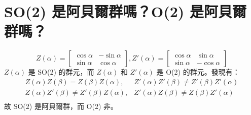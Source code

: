 \documentclass{article}
\begin{document}
\section{\~ SO(2) 是阿貝爾群嗎？O(2) 是阿貝爾群嗎？}
\begin{framed}
  $$Z\left( \alpha  \right) = \left[ {\begin{array}{*{20}{c}}
            {\cos \alpha } & { - \sin \alpha } \\
            {\sin \alpha } & {\cos \alpha }
          \end{array}} \right],Z'\left( \alpha  \right) = \left[ {\begin{array}{*{20}{c}}
            {\cos \alpha } & {\sin \alpha }    \\
            {\sin \alpha } & { - \cos \alpha }
          \end{array}} \right]$$
  $Z\left( \alpha  \right)$ 是 SO(2) 的群元，而 $Z\left( \alpha  \right)$ 和 $Z'\left( \alpha  \right)$ 是 O(2) 的群元。發現有：
  $$\begin{aligned}
      Z\left( \alpha  \right)Z\left( \beta  \right) = Z\left( \beta  \right)Z\left( \alpha  \right),     & Z'\left( \alpha  \right)Z'\left( \beta  \right) \ne Z'\left( \beta  \right)Z'\left( \alpha  \right) \\
      Z\left( \alpha  \right)Z'\left( \beta  \right) \ne Z'\left( \beta  \right)Z\left( \alpha  \right), & Z'\left( \alpha  \right)Z\left( \beta  \right) \ne Z\left( \beta  \right)Z'\left( \alpha  \right)   \\
    \end{aligned} $$
  故 SO(2) 是阿貝爾群，而 O(2) 非。
\end{framed}
\end{document}

